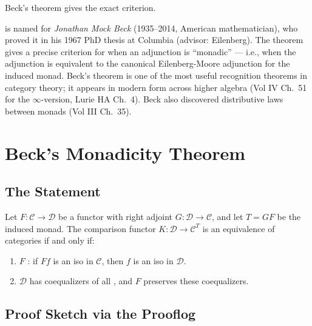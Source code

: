 Beck's theorem gives the exact criterion.


\begin{nameorigin}
 is named for \emph{Jonathan Mock Beck}
(1935--2014, American mathematician), who proved it in his 1967 PhD
thesis at Columbia (advisor: Eilenberg). The theorem gives a precise
criterion for when an adjunction is ``monadic'' — i.e., when the
adjunction is equivalent to the canonical Eilenberg-Moore adjunction
for the induced monad. Beck's theorem is one of the most useful
recognition theorems in category theory; it appears in modern form
across higher algebra (Vol IV Ch.~51 for the $\infty$-version, Lurie HA
Ch.~4). Beck also discovered distributive laws between monads (Vol III
Ch.~35).
\end{nameorigin}

\section{Beck's Monadicity Theorem}
\label{sec:beck}

\subsection{The Statement}

\begin{theorem}
Let $F : \mathcal{C} \to \mathcal{D}$ be a functor with right adjoint
$G : \mathcal{D} \to \mathcal{C}$, and let $T = GF$ be the induced monad.
The comparison functor $K : \mathcal{D} \to \mathcal{C}^T$ is an
equivalence of categories if and only if:
\begin{enumerate}
  \item[(B1)] $F$ : if $Ff$ is an iso in
              $\mathcal{C}$, then $f$ is an iso in $\mathcal{D}$.
  \item[(B2)] $\mathcal{D}$ has coequalizers of all , and $F$ preserves these coequalizers.
\end{enumerate}
\end{theorem}

\subsection{Proof Sketch via the Prooflog}

